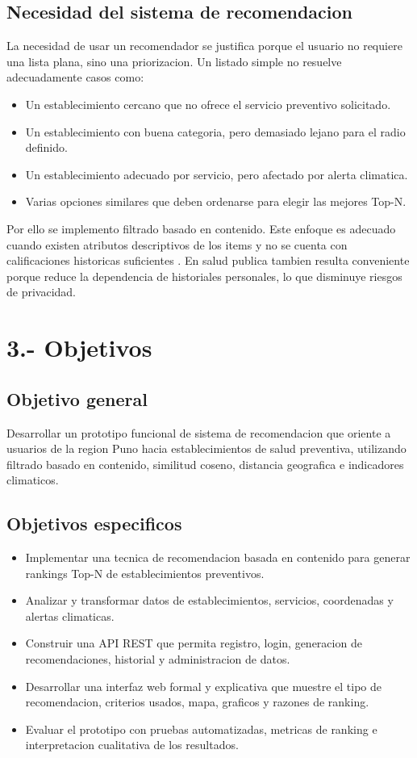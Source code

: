 \documentclass[12pt,a4paper]{article}
\begin{document}
\subsection{Necesidad del sistema de recomendacion}
La necesidad de usar un recomendador se justifica porque el usuario no requiere una lista plana, sino una priorizacion. Un listado simple no resuelve adecuadamente casos como:

\begin{itemize}[leftmargin=*]
  \item Un establecimiento cercano que no ofrece el servicio preventivo solicitado.
  \item Un establecimiento con buena categoria, pero demasiado lejano para el radio definido.
  \item Un establecimiento adecuado por servicio, pero afectado por alerta climatica.
  \item Varias opciones similares que deben ordenarse para elegir las mejores Top-N.
\end{itemize}

Por ello se implemento filtrado basado en contenido. Este enfoque es adecuado cuando existen atributos descriptivos de los items y no se cuenta con calificaciones historicas suficientes \citep{ricci2022}. En salud publica tambien resulta conveniente porque reduce la dependencia de historiales personales, lo que disminuye riesgos de privacidad.

\section{3.- Objetivos}
\subsection{Objetivo general}
Desarrollar un prototipo funcional de sistema de recomendacion que oriente a usuarios de la region Puno hacia establecimientos de salud preventiva, utilizando filtrado basado en contenido, similitud coseno, distancia geografica e indicadores climaticos.

\subsection{Objetivos especificos}
\begin{itemize}[leftmargin=*]
  \item Implementar una tecnica de recomendacion basada en contenido para generar rankings Top-N de establecimientos preventivos.
  \item Analizar y transformar datos de establecimientos, servicios, coordenadas y alertas climaticas.
  \item Construir una API REST que permita registro, login, generacion de recomendaciones, historial y administracion de datos.
  \item Desarrollar una interfaz web formal y explicativa que muestre el tipo de recomendacion, criterios usados, mapa, graficos y razones de ranking.
  \item Evaluar el prototipo con pruebas automatizadas, metricas de ranking e interpretacion cualitativa de los resultados.
\end{itemize}
\end{document}
